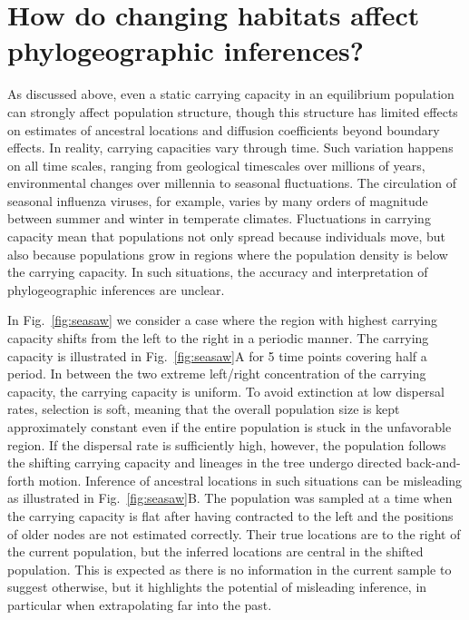 \documentclass[aps,rmp, twocolumn]{revtex4}
\begin{document}
\section*{How do changing habitats affect phylogeographic inferences?}
As discussed above, even a static carrying capacity in an equilibrium population can strongly affect population structure, though this structure has limited effects on estimates of ancestral locations and diffusion coefficients beyond boundary effects.
In reality, carrying capacities vary through time.
Such variation happens on all time scales, ranging from geological timescales over millions of years, environmental changes over millennia to seasonal fluctuations.
The circulation of seasonal influenza viruses, for example, varies by many orders of magnitude between summer and winter in temperate climates.
Fluctuations in carrying capacity mean that populations not only spread because individuals move, but also because populations grow in regions where the population density is below the carrying capacity.
In such situations, the accuracy and interpretation of phylogeographic inferences are unclear.

In Fig.~\ref{fig:seasaw} we consider a case where the region with highest carrying capacity shifts from the left to the right in a periodic manner.
The carrying capacity is illustrated in Fig.~\ref{fig:seasaw}A for 5 time points covering half a period.
In between the two extreme left/right concentration of the carrying capacity, the carrying capacity is uniform.
To avoid extinction at low dispersal rates, selection is soft, meaning that the overall population size is kept approximately constant even if the entire population is stuck in the unfavorable region.
If the dispersal rate is sufficiently high, however, the population follows the shifting carrying capacity and lineages in the tree undergo directed back-and-forth motion.
Inference of ancestral locations in such situations can be misleading as illustrated in Fig.~\ref{fig:seasaw}B.
The population was sampled at a time when the carrying capacity is flat after having contracted to the left and the positions of older nodes are not estimated correctly.
Their true locations are to the right of the current population, but the inferred locations are central in the shifted population.
This is expected as there is no information in the current sample to suggest otherwise, but it highlights the potential of misleading inference, in particular when extrapolating far into the past.
\end{document}
